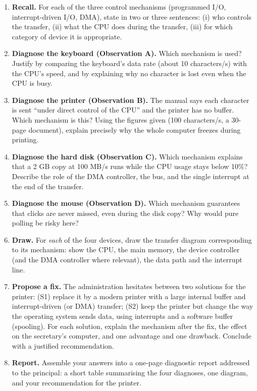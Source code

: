 \documentclass[11pt]{article}
\begin{document}
\begin{enumerate}
\item \textbf{Recall.} For each of the three control mechanisms (programmed I/O, interrupt-driven I/O, DMA), state in two or three sentences: (i) who controls the transfer, (ii) what the CPU does during the transfer, (iii) for which category of device it is appropriate.
\item \textbf{Diagnose the keyboard (Observation A).} Which mechanism is used? Justify by comparing the keyboard's data rate (about 10 characters/s) with the CPU's speed, and by explaining why no character is lost even when the CPU is busy.
\item \textbf{Diagnose the printer (Observation B).} The manual says each character is sent ``under direct control of the CPU'' and the printer has no buffer. Which mechanism is this? Using the figures given (100 characters/s, a 30-page document), explain precisely why the whole computer freezes during printing.
\item \textbf{Diagnose the hard disk (Observation C).} Which mechanism explains that a 2 GB copy at 100 MB/s runs while the CPU usage stays below 10\%? Describe the role of the DMA controller, the bus, and the single interrupt at the end of the transfer.
\item \textbf{Diagnose the mouse (Observation D).} Which mechanism guarantees that clicks are never missed, even during the disk copy? Why would pure polling be risky here?
\item \textbf{Draw.} For \emph{each} of the four devices, draw the transfer diagram corresponding to its mechanism: show the CPU, the main memory, the device controller (and the DMA controller where relevant), the data path and the interrupt line.
\item \textbf{Propose a fix.} The administration hesitates between two solutions for the printer: (S1) replace it by a modern printer with a large internal buffer and interrupt-driven (or DMA) transfer; (S2) keep the printer but change the way the operating system sends data, using interrupts and a software buffer (spooling). For each solution, explain the mechanism after the fix, the effect on the secretary's computer, and one advantage and one drawback. Conclude with a justified recommendation.
\item \textbf{Report.} Assemble your answers into a one-page diagnostic report addressed to the principal: a short table summarising the four diagnoses, one diagram, and your recommendation for the printer.
\end{enumerate}
\end{document}
